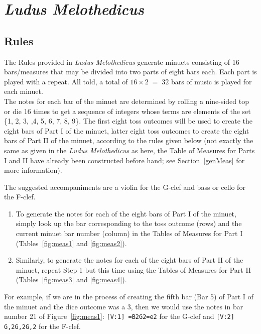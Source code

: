 \documentclass[a4paper,x11names,svgnames,10pt]{article}
\begin{document}
{\section{\em Ludus Melothedicus}

\subsection{Rules}\label{mdgRules}

The Rules provided in {\it Ludus Melothedicus} generate minuets consisting of 16 bars/measures that may be divided into two parts of eight bars each. Each part is played with a repeat. All told, a total of $16 \times 2 \;=\; 32$ bars of music is played for each minuet. \\

The notes for each bar of the minuet are determined by rolling a nine-sided top or die 16 times to get a sequence of integers whose terms are elements of the set \{1, 2, 3, ,4, 5, 6, 7, 8, 9\}. The first eight toss outcomes will be used to create the eight bars of Part I of the minuet, latter eight toss outcomes to create the eight bars of Part II of the minuet, according to the rules given below (not exactly the same as given in the {\em Ludus Melothedicus} as here, the Table of Measures for Parts I and II have already been constructed before hand; see Section~\ref*{genMeas} for more information). 

The suggested accompaniments are a violin for the G-clef and bass or cello for the F-clef.

\begin{enumerate}
	\item [1.\label{step1}] To generate the notes for each of the eight bars of Part I of the minuet, simply look up the bar corresponding to the toss outcome (rows) and the current minuet bar number (column) in the Tables of Measures for Part I (Tables~\ref{fig:meas1} and \ref{fig:meas2}).  
	
	\item [2.\label{step2}] Similarly, to generate the notes for each of the eight bars of Part II of the minuet, repeat Step 1 but this time using the Tables of Measures for Part II (Tables~\ref{fig:meas3} and \ref{fig:meas4}). 
\end{enumerate}   

For example, if we are in the process of creating the fifth bar (Bar 5) of Part I of the minuet and the dice outcome was a 3, then we would use the notes in bar number 21 of Figure~\ref{fig:meas1}: {\tt [V:1] =B2G2=e2} for the G-clef and {\tt [V:2] G,2G,2G,2} for the F-clef. 


}
\end{document}
